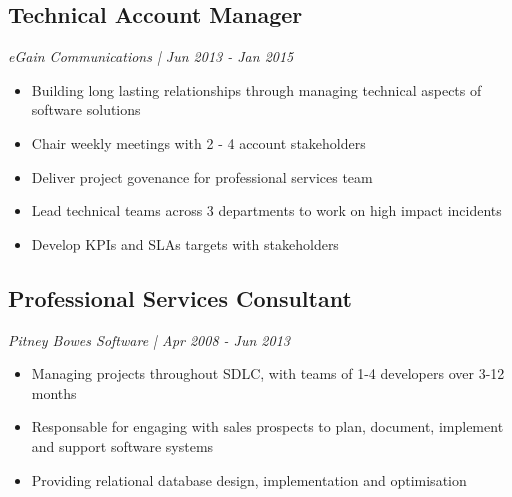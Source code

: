 \subsection{Technical Account Manager}
\textit{ eGain Communications | Jun 2013 - Jan 2015 }
\begin{itemize}
	\item Building long lasting relationships through managing technical aspects of software solutions
	\item Chair weekly meetings with 2 - 4 account stakeholders
	\item Deliver project govenance for professional services team
	\item Lead technical teams across 3 departments to work on high impact incidents
	\item Develop KPIs and SLAs targets with stakeholders
\end{itemize}

%
%
\subsection{Professional Services Consultant}
\textit{Pitney Bowes Software | Apr 2008 - Jun 2013}
\begin{itemize}
	\item Managing projects throughout SDLC, with teams of 1-4 developers over 3-12 months
	\item Responsable for engaging with sales prospects to plan, document, implement and support software systems
	\item Providing relational database design, implementation and optimisation
\end{itemize}
